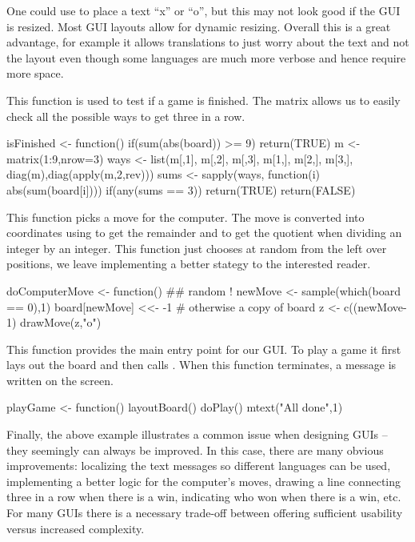 One could use  to place a text ``x'' or ``o'', but this may
not look good if the GUI is resized. Most GUI layouts allow for
dynamic resizing. Overall this is a great advantage, for example it
allows translations to just worry about the text and not the layout
even though some languages are much more verbose and hence require
more space.


This function is used to test if a game is finished. The matrix
 allows us to easily check all the possible ways to get three
in a row.
\begin{Schunk}
\begin{Sinput}
 isFinished <- function() {
   if(sum(abs(board)) >= 9) 
     return(TRUE)
   m <- matrix(1:9,nrow=3)
   ways <- list(m[,1], m[,2], m[,3],
                m[1,], m[2,], m[3,],
                diag(m),diag(apply(m,2,rev)))
   sums <- sapply(ways, function(i) abs(sum(board[i])))
   if(any(sums == 3)) 
     return(TRUE)
   return(FALSE)
 }
\end{Sinput}
\end{Schunk}

This function picks a move for the computer.  The move is converted
into coordinates using \code{\%\%} to get the remainder and
\code{\%/\%} to get the quotient when dividing an integer by an
integer. This function just chooses at random from the left over
positions, we leave implementing a better stategy to the interested
reader.

\begin{Schunk}
\begin{Sinput}
 doComputerMove <- function() {
   ## random !
   newMove <- sample(which(board == 0),1)
   board[newMove] <<- -1                 # otherwise a copy of board
   z <- c((newMove-1) %
   drawMove(z,"o")
 }
\end{Sinput}
\end{Schunk}


This function provides the main entry point for our GUI. To play a
game it first lays out the board and then calls
. When this function terminates, a message is written
on the screen.
\begin{Schunk}
\begin{Sinput}
 playGame <- function() {
   layoutBoard()
   doPlay()
   mtext("All done\n",1)
 }
\end{Sinput}
\end{Schunk}

Finally, the above example illustrates a common issue when designing
GUIs -- they seemingly can always be improved. In this case, there are
many obvious improvements: localizing the text messages so different
languages can be used, implementing a better logic for the computer's
moves, drawing a line connecting three in a row when there is a win,
indicating who won when there is a win, etc. For many GUIs there is a
necessary trade-off between offering sufficient usability versus
increased complexity.

